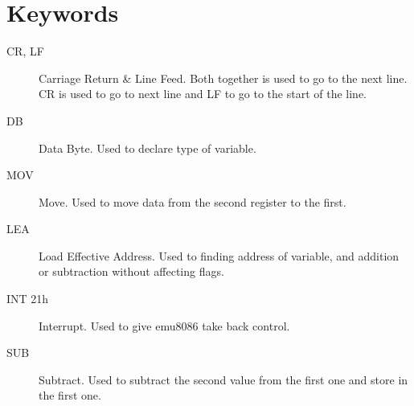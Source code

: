 \documentclass[12pt]{article}
\begin{document}





\section*{Keywords}
\begin{description}
    \item[CR, LF] Carriage Return \& Line Feed. Both together is used to go to the next line. CR is used to go to next line and LF to go to the start of the line.
    \item[DB] Data Byte. Used to declare type of variable.
    \item[MOV] Move. Used to move data from the second register to the first.
    \item[LEA] Load Effective Address. Used to finding address of variable, and addition or subtraction without affecting flags.
    \item[INT 21h] Interrupt. Used to give emu8086 take back control.
    \item[SUB] Subtract. Used to subtract the second value from the first one and store in the first one.
    \item[]
\end{description}



\end{document}

